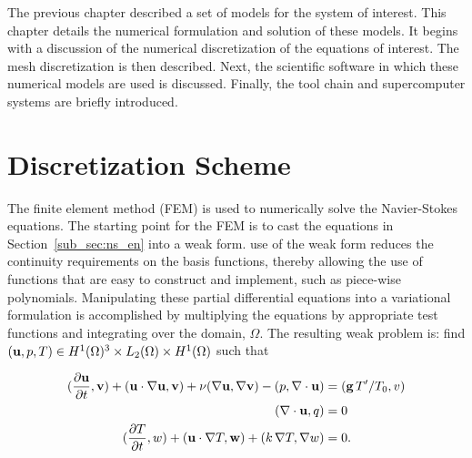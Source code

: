 \label{sec:software}

The previous chapter described a set of models 
for the system of interest. 
This chapter details the numerical formulation
and solution of these models. It begins with a 
discussion of the numerical discretization of the equations 
of interest. The mesh discretization is then described. 
Next, the scientific software in which these numerical 
models are used is discussed. Finally, the tool
chain and supercomputer systems are briefly introduced. 

\section{Discretization Scheme}
\label{sec:discretization}
The finite element method (FEM) is used to numerically solve the 
Navier-Stokes equations. The starting point for the FEM is
to cast the equations in Section~\ref{sub_sec:ns_en} into a weak
form. use of the weak form reduces the continuity requirements on the
basis functions, thereby allowing the use of functions that are
easy to construct and implement, such as piece-wise polynomials. 
Manipulating these partial differential equations into a
variational formulation is accomplished by multiplying the equations by
appropriate test functions and integrating over the domain,
$\Omega$. The resulting weak problem is: find $({\bf u},p,T) \in
H^1(\Omega)^3 \times L_2(\Omega) \times H^1(\Omega)$ such that 

%
%
\begin{align}
  (\frac{\partial{\bf u}}{\partial t},{\bf v}) + ({\bf u} \cdot \nabla{\bf
 u},{\bf v}) + \nu (\nabla{\bf u}, \nabla{\bf v})   
  -(p,\nabla \cdot{\bf u}) &= ({\bf g} \, T'/T_0,v)
 \label{eqn:ns_weak} \\
 (\nabla \cdot{\bf u},q) &= 0
 \label{eqn:cont_weak} \\
 (\frac{\partial T}{\partial t}, w) + ({\bf u} \cdot \nabla T,{\bf
 w}) + (k \, \nabla T, \nabla  w) &= 0.\label{eqn:en_weak}
\end{align}


